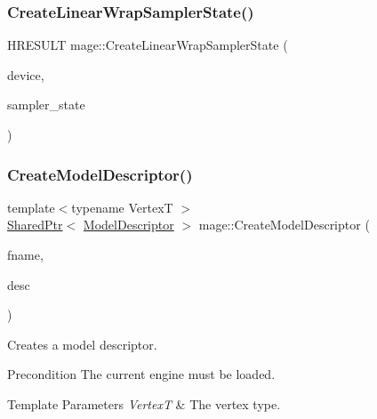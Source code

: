 \hypertarget{namespacemage_a714981745a2e53e5c55b04c4441bd2d0}{}\label{namespacemage_a714981745a2e53e5c55b04c4441bd2d0} 
\subsubsection{\texorpdfstring{Create\+Linear\+Wrap\+Sampler\+State()}{CreateLinearWrapSamplerState()}}
{\footnotesize\ttfamily H\+R\+E\+S\+U\+LT mage\+::\+Create\+Linear\+Wrap\+Sampler\+State (\begin{DoxyParamCaption}\item[{I\+D3\+D11\+Device2 $\ast$}]{device,  }\item[{I\+D3\+D11\+Sampler\+State $\ast$$\ast$}]{sampler\+\_\+state }\end{DoxyParamCaption})}

\hypertarget{namespacemage_a8cc26f80d3cb6f3d457bb06942880d84}{}\label{namespacemage_a8cc26f80d3cb6f3d457bb06942880d84} 
\subsubsection{\texorpdfstring{Create\+Model\+Descriptor()}{CreateModelDescriptor()}}
{\footnotesize\ttfamily template$<$typename VertexT $>$ \\
\hyperlink{namespacemage_a1e01ae66713838a7a67d30e44c67703e}{Shared\+Ptr}$<$ \hyperlink{classmage_1_1_model_descriptor}{Model\+Descriptor} $>$ mage\+::\+Create\+Model\+Descriptor (\begin{DoxyParamCaption}\item[{const wstring \&}]{fname,  }\item[{const \hyperlink{structmage_1_1_mesh_descriptor}{Mesh\+Descriptor}$<$ VertexT $>$ \&}]{desc }\end{DoxyParamCaption})}

Creates a model descriptor.

\begin{DoxyPrecond}{Precondition}
The current engine must be loaded. 
\end{DoxyPrecond}

\begin{DoxyTemplParams}{Template Parameters}
{\em VertexT} & The vertex type. \\
\hline
\end{DoxyTemplParams}

